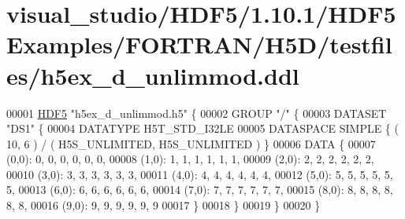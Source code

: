 \hypertarget{visual__studio_2_h_d_f5_21_810_81_2_h_d_f5_examples_2_f_o_r_t_r_a_n_2_h5_d_2testfiles_2h5ex__d__unlimmod_8ddl_source}{}\section{visual\+\_\+studio/\+H\+D\+F5/1.10.1/\+H\+D\+F5\+Examples/\+F\+O\+R\+T\+R\+A\+N/\+H5\+D/testfiles/h5ex\+\_\+d\+\_\+unlimmod.ddl}
\label{visual__studio_2_h_d_f5_21_810_81_2_h_d_f5_examples_2_f_o_r_t_r_a_n_2_h5_d_2testfiles_2h5ex__d__unlimmod_8ddl_source}

\begin{DoxyCode}
00001 \hyperlink{namespace_h_d_f5}{HDF5} \textcolor{stringliteral}{"h5ex\_d\_unlimmod.h5"} \{
00002 GROUP \textcolor{stringliteral}{"/"} \{
00003    DATASET \textcolor{stringliteral}{"DS1"} \{
00004       DATATYPE  H5T\_STD\_I32LE
00005       DATASPACE  SIMPLE \{ ( 10, 6 ) / ( H5S\_UNLIMITED, H5S\_UNLIMITED ) \}
00006       DATA \{
00007       (0,0): 0, 0, 0, 0, 0, 0,
00008       (1,0): 1, 1, 1, 1, 1, 1,
00009       (2,0): 2, 2, 2, 2, 2, 2,
00010       (3,0): 3, 3, 3, 3, 3, 3,
00011       (4,0): 4, 4, 4, 4, 4, 4,
00012       (5,0): 5, 5, 5, 5, 5, 5,
00013       (6,0): 6, 6, 6, 6, 6, 6,
00014       (7,0): 7, 7, 7, 7, 7, 7,
00015       (8,0): 8, 8, 8, 8, 8, 8,
00016       (9,0): 9, 9, 9, 9, 9, 9
00017       \}
00018    \}
00019 \}
00020 \}
\end{DoxyCode}
